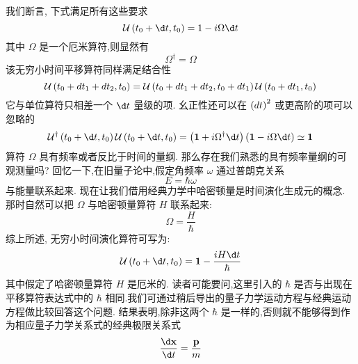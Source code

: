 我们断言, 下式满足所有这些要求
\begin{equation}
	\mathcal{U}\left( {{t}_{0} + {\d t},{t}_{0}}\right) = 1 - {i\Omega \d t}
\end{equation}
其中 $\Omega$ 是一个厄米算符,则显然有
\begin{equation}
	{\Omega }^{ \dagger } = \Omega
\end{equation}
该无穷小时间平移算符同样满足结合性
\begin{equation}
	\mathcal{U}\left( {{t}_{0} + \\d{t}_{1} + \\d{t}_{2},{t}_{0}}\right) = \mathcal{U}\left( {{t}_{0} + \\d{t}_{1} + \\d{t}_{2},{t}_{0} + \\d{t}_{1}}\right) \mathcal{U}\left( {{t}_{0} + \\d{t}_{1},{t}_{0}}\right) 
\end{equation}
它与单位算符只相差一个 ${\d t}$ 量级的项. 幺正性还可以在 ${\left( \\d t\right) }^{2}$ 或更高阶的项可以忽略的
\begin{equation}
	{\mathcal{U}}^{ \dagger }\left( {{t}_{0} + {\d t},{t}_{0}}\right) \mathcal{U}\left( {{t}_{0} + {\d t},{t}_{0}}\right) = \left( {\textbf{1} + i{\Omega }^{ \dagger }{\d t}}\right) \left( {\textbf{1} - {i\Omega \d t}}\right) \simeq \textbf{1}
\end{equation}
算符 $\Omega$ 具有频率或者反比于时间的量纲. 那么存在我们熟悉的具有频率量纲的可观测量吗? 回忆一下,在旧量子论中,假定角频率 $\omega$ 通过普朗克关系
\begin{equation}
	E = \hbar \omega
\end{equation}
与能量联系起来. 现在让我们借用经典力学中哈密顿量是时间演化生成元的概念. 那时自然可以把 $\Omega$ 与哈密顿量算符 $H$ 联系起来:
\begin{equation}
	\Omega = \frac{H}{\hbar }
\end{equation}
综上所述, 无穷小时间演化算符可写为:
\begin{equation}
	\mathcal{U}\left( {{t}_{0} + {\d t},{t}_{0}}\right) = \textbf{1} - \frac{iH\d t}{\hbar }
\end{equation}
其中假定了哈密顿量算符 $H$ 是厄米的. 读者可能要问,这里引入的 $\hbar$ 是否与出现在平移算符表达式中的 $\hbar$ 相同.我们可通过稍后导出的量子力学运动方程与经典运动方程做比较回答这个问题. 结果表明,除非这两个 $\hbar$ 是一样的,否则就不能够得到作为相应量子力学关系式的经典极限关系式
\begin{equation}
	\frac{\d\mathbf{x}}{\d t} = \frac{\mathbf{p}}{m}
\end{equation}
